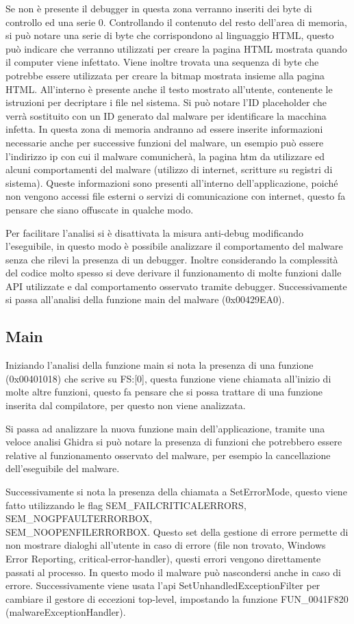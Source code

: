 \documentclass[]{article}
\begin{document}
Se non è presente il debugger in questa zona verranno inseriti dei byte di controllo ed una serie 0. Controllando il contenuto del resto dell'area di memoria, si può notare una serie di byte che corrispondono al linguaggio HTML, questo può indicare che verranno utilizzati per creare la pagina HTML mostrata quando il computer viene infettato. Viene inoltre trovata una sequenza di byte che potrebbe essere utilizzata per creare la bitmap mostrata insieme alla pagina HTML. All'interno è presente anche il testo mostrato all'utente, contenente le istruzioni per decriptare i file nel sistema. Si può notare l'ID placeholder che verrà sostituito con un ID generato dal malware per identificare la macchina infetta. 
In questa zona di memoria andranno ad essere inserite informazioni necessarie anche per successive funzioni del malware, un esempio può essere l'indirizzo ip con cui il malware comunicherà, la pagina htm da utilizzare ed alcuni comportamenti del malware (utilizzo di internet, scritture su registri di sistema).  Queste informazioni sono presenti all'interno dell'applicazione, poiché non vengono accessi file esterni o servizi di comunicazione con internet, questo fa pensare che siano offuscate in qualche modo.

Per facilitare l'analisi si è disattivata la misura anti-debug modificando l'eseguibile, in questo modo è possibile analizzare il comportamento del malware senza che rilevi la presenza di un debugger. Inoltre considerando la complessità del codice molto spesso si deve derivare il funzionamento di molte funzioni dalle API utilizzate e dal comportamento osservato tramite debugger.
Successivamente si passa all'analisi della funzione main del malware (0x00429EA0).

\subsection{Main}
Iniziando l'analisi della funzione main si nota la presenza di una funzione (0x00401018) che scrive su FS:[0], questa funzione viene chiamata all'inizio di molte altre funzioni, questo fa pensare che si possa trattare di una funzione inserita dal compilatore, per questo non viene analizzata.

Si passa ad analizzare la nuova funzione main dell'applicazione, tramite una veloce analisi Ghidra si può notare la presenza di funzioni che potrebbero essere relative al funzionamento osservato del malware, per esempio la cancellazione dell'eseguibile del malware. 

Successivamente si nota la presenza della chiamata a SetErrorMode, questo viene fatto utilizzando le flag SEM\_FAILCRITICALERRORS, SEM\_NOGPFAULTERRORBOX, \\SEM\_NOOPENFILERRORBOX. Questo set della gestione di errore permette di non mostrare dialoghi all'utente in caso di errore (file non trovato, Windows Error Reporting, critical-error-handler), questi errori vengono direttamente passati al processo. In questo modo il malware può nascondersi anche in caso di errore. Successivamente viene usata l'api SetUnhandledExceptionFilter per cambiare il gestore di eccezioni top-level, impostando la funzione FUN\_0041F820 (malwareExceptionHandler). 
\end{document}
